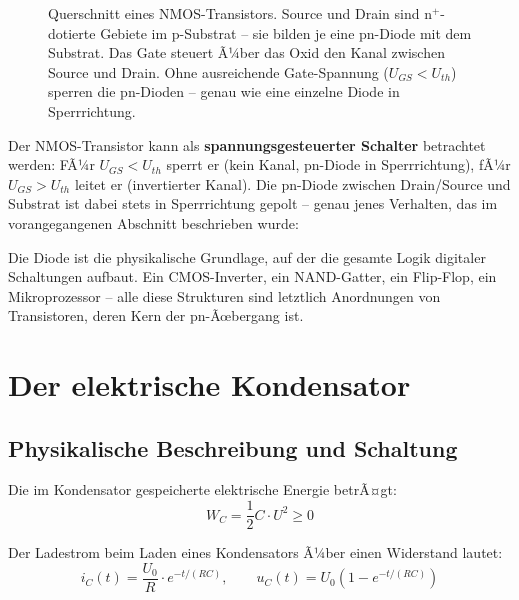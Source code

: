 ﻿\documentclass[12pt, a4paper]{article}
\begin{document}
\begin{figure}[h]
		\caption{Querschnitt eines NMOS-Transistors. Source und Drain sind
			n$^+$-dotierte Gebiete im p-Substrat -- sie bilden je eine pn-Diode mit dem
			Substrat. Das Gate steuert Ã¼ber das Oxid den Kanal zwischen Source und Drain.
			Ohne ausreichende Gate-Spannung ($U_{GS} < U_{th}$) sperren die pn-Dioden --
			genau wie eine einzelne Diode in Sperrrichtung.}
		\label{fig:nmos_querschnitt}
	\end{figure}
	
	Der NMOS-Transistor kann als \textbf{spannungsgesteuerter Schalter} betrachtet
	werden: FÃ¼r $U_{GS} < U_{th}$ sperrt er (kein Kanal, pn-Diode in Sperrrichtung),
	fÃ¼r $U_{GS} > U_{th}$ leitet er (invertierter Kanal). Die pn-Diode zwischen
	Drain/Source und Substrat ist dabei stets in Sperrrichtung gepolt -- genau
	jenes Verhalten, das im vorangegangenen Abschnitt beschrieben wurde:
	
	Die Diode ist die physikalische Grundlage, auf der die gesamte Logik
	digitaler Schaltungen aufbaut. Ein CMOS-Inverter, ein NAND-Gatter, ein
	Flip-Flop, ein Mikroprozessor -- alle diese Strukturen sind letztlich
	Anordnungen von Transistoren, deren Kern der pn-Ãœbergang ist.
	
	\section{Der elektrische Kondensator}
	
	\subsection{Physikalische Beschreibung und Schaltung}
	
	Die im Kondensator gespeicherte elektrische Energie betrÃ¤gt:
	\begin{equation}
		W_C = \frac{1}{2} C \cdot U^2 \geq 0
		\label{eq:kondensator_energie}
	\end{equation}
	
	Der Ladestrom beim Laden eines Kondensators Ã¼ber einen Widerstand lautet:
	\begin{equation}
		i_C(t) = \frac{U_0}{R} \cdot e^{-t/(RC)}, \qquad
		u_C(t) = U_0 \left(1 - e^{-t/(RC)}\right)
	\end{equation}
	
\end{document}
